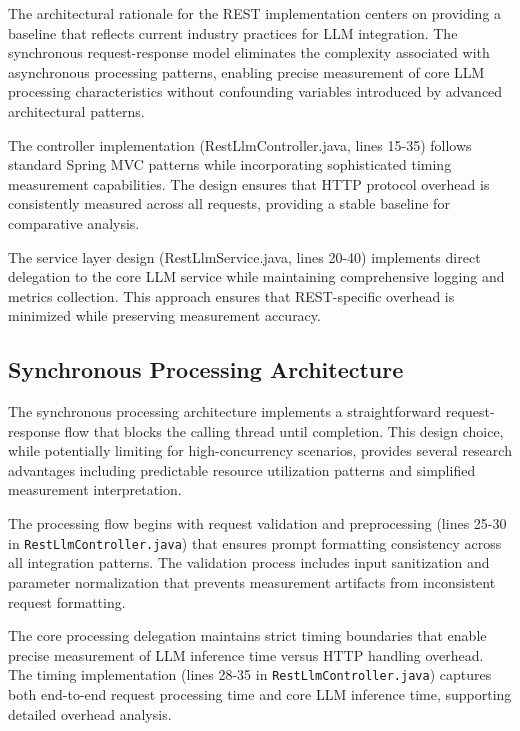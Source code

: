The architectural rationale for the REST implementation centers on providing a baseline that reflects current industry practices for LLM integration. The synchronous request-response model eliminates the complexity associated with asynchronous processing patterns, enabling precise measurement of core LLM processing characteristics without confounding variables introduced by advanced architectural patterns.

The controller implementation (RestLlmController.java, lines 15-35) follows standard Spring MVC patterns while incorporating sophisticated timing measurement capabilities. The design ensures that HTTP protocol overhead is consistently measured across all requests, providing a stable baseline for comparative analysis.


The service layer design (RestLlmService.java, lines 20-40) implements direct delegation to the core LLM service while maintaining comprehensive logging and metrics collection. This approach ensures that REST-specific overhead is minimized while preserving measurement accuracy.


\subsection{Synchronous Processing Architecture}

The synchronous processing architecture implements a straightforward request-response flow that blocks the calling thread until completion. This design choice, while potentially limiting for high-concurrency scenarios, provides several research advantages including predictable resource utilization patterns and simplified measurement interpretation.

The processing flow begins with request validation and preprocessing (lines 25-30 in \texttt{RestLlmController.java}) that ensures prompt formatting consistency across all integration patterns. The validation process includes input sanitization and parameter normalization that prevents measurement artifacts from inconsistent request formatting.


The core processing delegation maintains strict timing boundaries that enable precise measurement of LLM inference time versus HTTP handling overhead. The timing implementation (lines 28-35 in \texttt{RestLlmController.java}) captures both end-to-end request processing time and core LLM inference time, supporting detailed overhead analysis.

